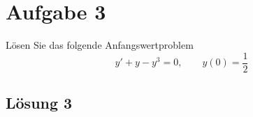 \documentclass[main.tex]{subfiles}
\begin{document}
\section{Aufgabe 3}
Lösen Sie das folgende Anfangswertproblem
\[
    y' + y - y^3 = 0, \qquad y(0) = \frac{1}{2}
\]

\subsection{Lösung 3}
\end{document}
